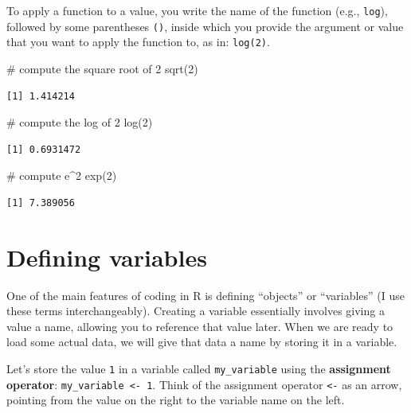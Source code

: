 \documentclass[
  letterpaper,
  DIV=11,
  numbers=noendperiod]{scrreprt}
\newenvironment{Shaded}{\begin{snugshade}}{\end{snugshade}}
\newcommand{\CommentTok}[1]{\textcolor[rgb]{0.37,0.37,0.37}{#1}}
\newcommand{\DecValTok}[1]{\textcolor[rgb]{0.68,0.00,0.00}{#1}}
\newcommand{\FunctionTok}[1]{\textcolor[rgb]{0.28,0.35,0.67}{#1}}
\newcommand{\NormalTok}[1]{\textcolor[rgb]{0.00,0.23,0.31}{#1}}
\begin{document}
To apply a function to a value, you write the name of the function
(e.g., \texttt{log}), followed by some parentheses \texttt{()}, inside
which you provide the argument or value that you want to apply the
function to, as in: \texttt{log(2)}.

\begin{Shaded}
\begin{Highlighting}[]
\CommentTok{\# compute the square root of 2}
\FunctionTok{sqrt}\NormalTok{(}\DecValTok{2}\NormalTok{)}
\end{Highlighting}
\end{Shaded}

\begin{verbatim}
[1] 1.414214
\end{verbatim}

\begin{Shaded}
\begin{Highlighting}[]
\CommentTok{\# compute the log of 2}
\FunctionTok{log}\NormalTok{(}\DecValTok{2}\NormalTok{)}
\end{Highlighting}
\end{Shaded}

\begin{verbatim}
[1] 0.6931472
\end{verbatim}

\begin{Shaded}
\begin{Highlighting}[]
\CommentTok{\# compute e\^{}2}
\FunctionTok{exp}\NormalTok{(}\DecValTok{2}\NormalTok{)}
\end{Highlighting}
\end{Shaded}

\begin{verbatim}
[1] 7.389056
\end{verbatim}

\section{Defining variables}\label{defining-variables}

One of the main features of coding in R is defining ``objects'' or
``variables'' (I use these terms interchangeably). Creating a variable
essentially involves giving a value a name, allowing you to reference
that value later. When we are ready to load some actual data, we will
give that data a name by storing it in a variable.

Let's store the value \texttt{1} in a variable called
\texttt{my\_variable} using the \textbf{assignment operator}:
\texttt{my\_variable\ \textless{}-\ 1}. Think of the assignment operator
\texttt{\textless{}-} as an arrow, pointing from the value on the right
to the variable name on the left.
\end{document}
